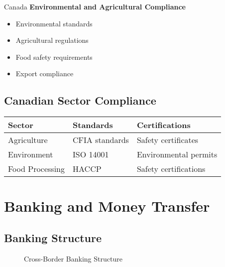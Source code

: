 \begin{regionalbox}{Canada}
\textbf{Environmental and Agricultural Compliance}
\begin{itemize}
    \item Environmental standards
    \item Agricultural regulations
    \item Food safety requirements
    \item Export compliance
\end{itemize}

\subsection{Canadian Sector Compliance}\label{subsec:canadian-sector-compliance}
\begin{center}
\begin{tabularx}{\textwidth}{>{\raggedright\arraybackslash}X >{\centering\arraybackslash}X >{\raggedright\arraybackslash}X}
    \toprule
    \textbf{Sector} & \textbf{Standards} & \textbf{Certifications} \\
    \midrule
    Agriculture & CFIA standards & Safety certificates \\
    Environment & ISO 14001 & Environmental permits \\
    Food Processing & HACCP & Safety certifications \\
    \bottomrule
\end{tabularx}
\end{center}
\end{regionalbox}

\FloatBarrier
\section{Banking and Money Transfer}\label{sec:banking-and-money-transfer}

\subsection{Banking Structure}\label{subsec:banking-structure}
\begin{figure}[htbp]
    \centering
    \caption{Cross-Border Banking Structure}
    \label{fig:banking-structure}
\end{figure}

